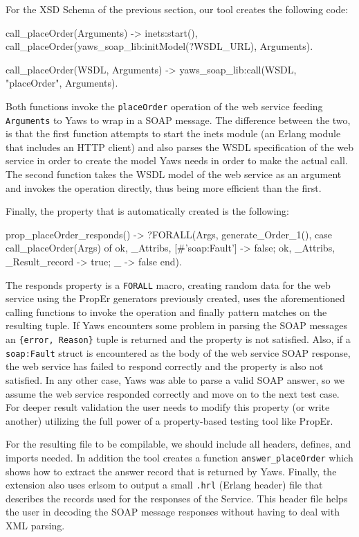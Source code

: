 \documentclass[submission,copyright]{eptcs}
\begin{document}
For the XSD Schema of the previous section, our tool creates the following code:
\begin{lsterlang}[firstnumber=38]
call_placeOrder(Arguments) ->
  inets:start(),
  call_placeOrder(yaws_soap_lib:initModel(?WSDL_URL), Arguments).
    
call_placeOrder(WSDL, Arguments) ->
  yaws_soap_lib:call(WSDL, "placeOrder", Arguments).
\end{lsterlang}
Both functions invoke the \texttt{placeOrder} operation of the
web service feeding \texttt{Arguments} to Yaws to wrap in a SOAP
message. The difference between the two, is that the first function
attempts to start the inets module (an Erlang module that includes an
HTTP client) and also parses the WSDL specification of the web service
in order to create the model Yaws needs in order to make the actual
call. The second function takes the WSDL model of the web service as
an argument and invokes the operation directly, thus being more
efficient than the first.

Finally, the property that is automatically created is the following:
\begin{lsterlang}[firstnumber=46]
prop_placeOrder_responds() ->
  ?FORALL(Args, generate_Order_1(),
           case call_placeOrder(Args) of 
             {ok, _Attribs, [#'soap:Fault'{}]} -> false;
             {ok, _Attribs, _Result_record} -> true;
             _ -> false
           end).
\end{lsterlang}

The responds property is a \texttt{FORALL} macro, creating random data
for the web service using the PropEr generators previously created,
uses the aforementioned calling functions to invoke the operation and
finally pattern matches on the resulting tuple. If Yaws encounters
some problem in parsing the SOAP messages an \texttt{\{error,
  Reason\}} tuple is returned and the property is not satisfied. Also,
if a \texttt{soap:Fault} struct is encountered as the body of the web
service SOAP response, the web service has failed to respond correctly
and the property is also not satisfied. In any other case, Yaws was
able to parse a valid SOAP answer, so we assume the web service
responded correctly and move on to the next test case. For deeper
result validation the user needs to modify this property (or write
another) utilizing the full power of a property-based testing tool
like PropEr.

For the resulting file to be compilable, we should include all
headers, defines, and imports needed. In addition the tool creates a
function \texttt{answer\_placeOrder} which shows how to extract the
answer record that is returned by Yaws. Finally, the extension also
uses erlsom to output a small \texttt{.hrl} (Erlang header) file that
describes the records used for the responses of the Service. This
header file helps the user in decoding the SOAP message responses
without having to deal with XML parsing.
\end{document}
